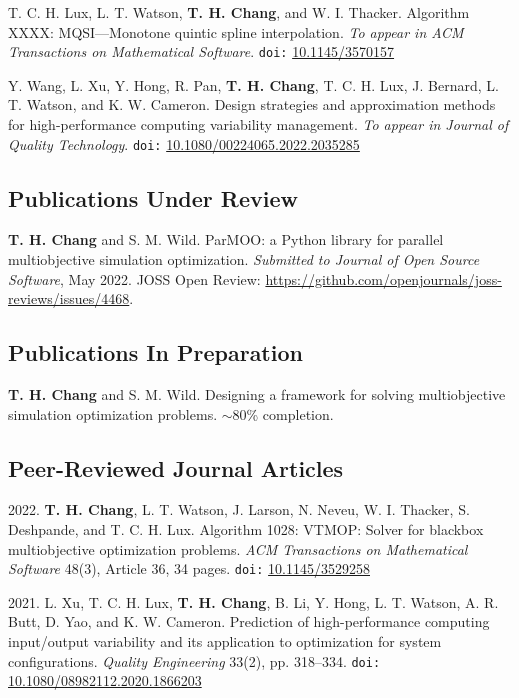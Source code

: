 \documentclass[10pt]{article}
\begin{document}
\medskip

T. C. H. Lux, L. T. Watson, {\bf T. H. Chang}, and W. I. Thacker. Algorithm XXXX: MQSI---Monotone quintic spline interpolation. {\sl To appear in ACM Transactions on Mathematical Software}. {\tt doi:} \href{https://doi.org/10.1145/3570157}{10.1145/3570157}

\medskip

Y. Wang, L. Xu, Y. Hong, R. Pan, {\bf T. H. Chang}, T. C. H. Lux, J. Bernard, L. T. Watson, and K. W. Cameron. Design strategies and approximation methods for high-performance computing variability management. {\sl To appear in Journal of Quality Technology}. {\tt doi:} \href{https://doi.org/10.1080/00224065.2022.2035285}{10.1080/00224065.2022.2035285}
\subsection*{Publications Under Review}
{\bf T. H. Chang} and S. M. Wild. ParMOO: a Python library for parallel multiobjective simulation optimization. {\sl Submitted to Journal of Open Source Software}, May 2022. JOSS Open Review: \url{https://github.com/openjournals/joss-reviews/issues/4468}. 
\subsection*{Publications In Preparation}
{\bf T. H. Chang} and S. M. Wild. Designing a framework for solving multiobjective simulation optimization problems. \(\sim\)80\% completion. 
\subsection*{Peer-Reviewed Journal Articles}
2022. {\bf T. H. Chang}, L. T. Watson, J. Larson, N. Neveu, W. I. Thacker, S. Deshpande, and T. C. H. Lux. Algorithm 1028: VTMOP: Solver for blackbox multiobjective optimization problems. {\sl ACM Transactions on Mathematical Software} 48(3), Article 36, 34 pages. {\tt doi:} \href{https://doi.org/10.1145/3529258}{10.1145/3529258}

\medskip

2021. L. Xu, T. C. H. Lux, {\bf T. H. Chang}, B. Li, Y. Hong, L. T. Watson, A. R. Butt, D. Yao, and K. W. Cameron. Prediction of high-performance computing input/output variability and its application to optimization for system configurations. {\sl Quality Engineering} 33(2), pp. 318--334. {\tt doi:} \href{https://doi.org/10.1080/08982112.2020.1866203}{10.1080/08982112.2020.1866203}
\end{document}

